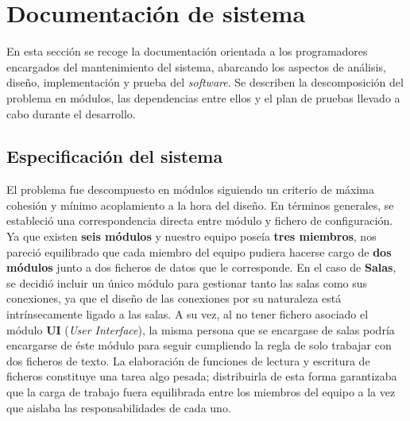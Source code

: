 

\section{Documentación de sistema}


En esta sección se recoge la documentación orientada a los programadores encargados 
del mantenimiento del sistema, abarcando los aspectos de análisis, diseño, implementación y prueba del \textit{software}. 
Se describen la descomposición del problema en módulos, las dependencias entre ellos 
y el plan de pruebas llevado a cabo durante el desarrollo.

\subsection{Especificación del sistema}

El problema fue descompuesto en módulos siguiendo un criterio de máxima cohesión y mínimo acoplamiento a la hora del diseño. 
En términos generales, se estableció una correspondencia directa entre módulo y fichero de configuración. Ya que existen \textbf{seis módulos} y
nuestro equipo poseía \textbf{tres miembros}, nos pareció equilibrado que cada miembro del equipo pudiera hacerse cargo de \textbf{dos
módulos} junto a dos ficheros de datos que le corresponde. En el caso de \textbf{Salas}, se decidió incluir un único módulo
para gestionar tanto las salas como sus conexiones, ya que el diseño de las conexiones por su naturaleza está intrínsecamente ligado
a las salas. A su vez, al no tener fichero asociado el módulo \textbf{UI} (\emph{User Interface}), la misma persona que se encargase
de salas podría encargarse de éste módulo para seguir cumpliendo la regla de solo trabajar con dos ficheros de texto.
La elaboración de funciones de lectura y escritura de ficheros constituye una tarea algo pesada; 
distribuirla de esta forma garantizaba que la carga de trabajo fuera equilibrada entre los miembros del equipo 
a la vez que aislaba las responsabilidades de cada uno.

\bigskip

